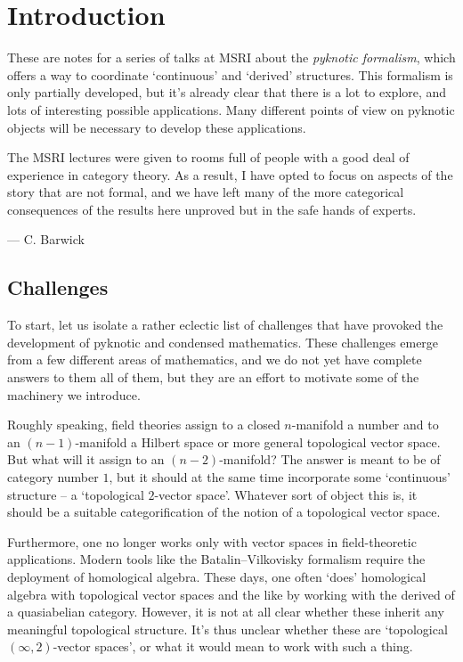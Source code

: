 \section*{Introduction}

These are notes for a series of talks at MSRI about the \emph{pyknotic formalism}, which offers a way to coordinate `continuous' and `derived' structures.
This formalism is only partially developed, but it’s already clear that there is a lot to explore, and lots of interesting possible applications.
Many different points of view on pyknotic objects will be necessary to develop these applications.

The MSRI lectures were given to rooms full of people with a good deal of experience in category theory.
As a result, I have opted to focus on aspects of the story that are not formal, and we have left many of the more categorical consequences of the results here unproved but in the safe hands of experts.

\noindent --- C. Barwick

\subsection*{Challenges}

To start, let us isolate a rather eclectic list of challenges that have provoked the development of pyknotic and condensed mathematics.
These challenges emerge from a few different areas of mathematics, and we do not yet have complete answers to them all of them, but they are an effort to motivate some of the machinery we introduce.

\begin{exm*}	
	Roughly speaking, field theories assign to a closed $ n $-manifold a number and to an $ (n-1) $-manifold a Hilbert space or more general topological vector space.
	But what will it assign to an $ (n-2) $-manifold?
	The answer is meant to be of category number $ 1 $, but it should at the same time incorporate some `continuous' structure -- a `topological $ 2 $-vector space'.
	Whatever sort of object this is, it should be a suitable categorification of the notion of a topological vector space.

	Furthermore, one no longer works only with vector spaces in field-theoretic applications.
	Modern tools like the Batalin--Vilkovisky formalism require the deployment of homological algebra.
	These days, one often `does' homological algebra with topological vector spaces and the like by working with the derived \category of a quasiabelian category.
	However, it is not at all clear whether these \categories inherit any meaningful topological structure.
	It's thus unclear whether these \categories are `topological $ (\infty,2) $-vector spaces', or what it would mean to work with such a thing.
\end{exm*}

